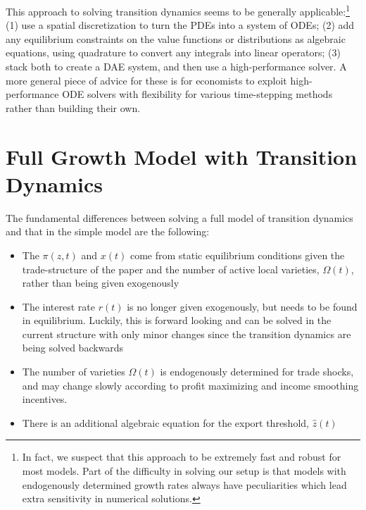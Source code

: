 \documentclass[11pt]{article}
\begin{document}
This approach to solving transition dynamics seems to be generally applicable:\footnote{In fact, we suspect that this approach to be extremely fast and robust for most models.  Part of the difficulty in solving our setup is that models with endogenously determined growth rates always have peculiarities which lead extra sensitivity in numerical solutions.} (1) use a spatial discretization to turn the PDEs into a system of ODEs; (2) add any equilibrium constraints on the value functions or distributions as algebraic equations, using quadrature to convert any integrals into linear operators; (3) stack both to create a DAE system, and then use a high-performance solver.  A more general piece of advice for these is for economists to exploit high-performance ODE solvers with flexibility for various time-stepping methods rather than building their own.

\section{Full Growth Model with Transition Dynamics}
The fundamental differences between solving a full model of transition dynamics and that in the simple model are the following:
\begin{itemize}
	\item The $\pi(z,t)$ and $x(t)$ come from static equilibrium conditions given the trade-structure of the paper and the number of active local varieties, $\Omega(t)$, rather than being given exogenously
	\item The interest rate $r(t)$ is no longer given exogenously, but needs to be found in equilibrium.  Luckily, this is forward looking and can be solved in the current structure with only minor changes since the transition dynamics are being solved backwards
	\item The number of varieties $\Omega(t)$ is endogenously determined for trade shocks, and may change slowly according to profit maximizing and income smoothing incentives.
	\item There is an additional algebraic equation for the export threshold, $\hat{z}(t)$
\end{itemize}
\end{document}
